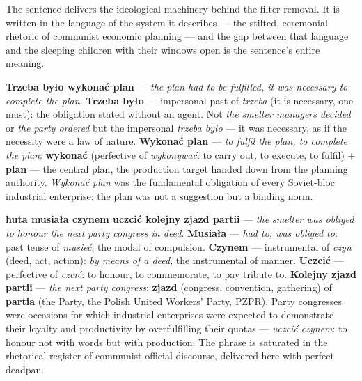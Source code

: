 
The sentence delivers the ideological machinery behind
the filter removal. It is written in the language of
the system it describes --- the stilted, ceremonial
rhetoric of communist economic planning --- and the
gap between that language and the sleeping children
with their windows open is the sentence's entire
meaning.

\textbf{Trzeba było wykonać plan} --- \textit{the plan
had to be fulfilled, it was necessary to complete the
plan}. \textbf{Trzeba było} --- impersonal past of
\textit{trzeba} (it is necessary, one must): the
obligation stated without an agent. Not \textit{the
smelter managers decided} or \textit{the party
ordered} but the impersonal \textit{trzeba było} ---
it was necessary, as if the necessity were a law of
nature. \textbf{Wykonać plan} --- \textit{to fulfil
the plan, to complete the plan}: \textbf{wykonać}
(perfective of \textit{wykonywać}: to carry out, to
execute, to fulfil) + \textbf{plan} --- the central
plan, the production target handed down from the
planning authority. \textit{Wykonać plan} was the
fundamental obligation of every Soviet-bloc industrial
enterprise: the plan was not a suggestion but a
binding norm.

\textbf{huta musiała czynem uczcić kolejny zjazd
partii} --- \textit{the smelter was obliged to honour
the next party congress in deed}. \textbf{Musiała}
--- \textit{had to, was obliged to}: past tense of
\textit{musieć}, the modal of compulsion.
\textbf{Czynem} --- instrumental of \textit{czyn}
(deed, act, action): \textit{by means of a deed},
the instrumental of manner. \textbf{Uczcić} ---
perfective of \textit{czcić}: to honour, to
commemorate, to pay tribute to. \textbf{Kolejny
zjazd partii} --- \textit{the next party congress}:
\textbf{zjazd} (congress, convention, gathering)
of \textbf{partia} (the Party, the Polish United
Workers' Party, PZPR). Party congresses were
occasions for which industrial enterprises were
expected to demonstrate their loyalty and
productivity by overfulfilling their quotas ---
\textit{uczcić czynem}: to honour not with words
but with production. The phrase is saturated in
the rhetorical register of communist official
discourse, delivered here with perfect deadpan.


